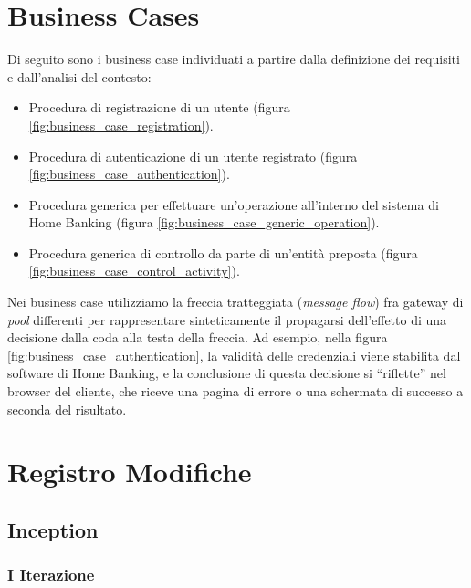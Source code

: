 \documentclass[10pt]{softeng} %
\begin{document}
\startofdocument{}









\section{Business Cases}

Di seguito sono i business case individuati a partire dalla definizione dei requisiti e dall'analisi del contesto:
\begin{itemize}
	\item Procedura di registrazione di un utente (figura \ref{fig:business_case_registration}).
	\item Procedura di autenticazione di un utente registrato (figura \ref{fig:business_case_authentication}).
	\item Procedura generica per effettuare un'operazione all'interno del sistema di Home Banking (figura \ref{fig:business_case_generic_operation}).
	\item Procedura generica di controllo da parte di un'entit\`a preposta (figura \ref{fig:business_case_control_activity}).
\end{itemize}
Nei business case utilizziamo la freccia tratteggiata (\emph{message flow}) fra gateway di \emph{pool} differenti per rappresentare sinteticamente il propagarsi dell'effetto di una decisione dalla coda alla testa della freccia.
Ad esempio, nella figura \ref{fig:business_case_authentication}, la validit\`a delle credenziali viene stabilita dal software di Home Banking, e la conclusione di questa decisione si ``riflette'' nel browser del cliente, che riceve una pagina di errore o una schermata di successo a seconda del risultato.

\appendix

\section{Registro Modifiche}

\subsection{Inception}

\subsubsection{I Iterazione}
\end{document}
